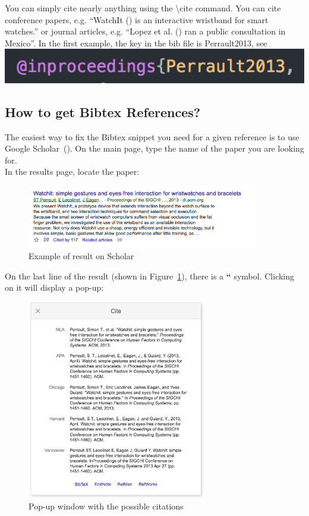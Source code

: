 You can simply cite nearly anything using the \textbackslash{}cite command.
You can cite conference papers, e.g. ``WatchIt (\cite{Perrault2013}) is an interactive wristband for smart watches.'' or journal articles, e.g. ``Lopez et al. (\cite{Lopez2017}) ran a public consultation in Mexico''.
In the first example, the key in the bib file is Perrault2013, see\\
\includegraphics{figures/bibtexkey}

\subsection{How to get Bibtex References?}
The easiest way to fix the Bibtex snippet you need for a given reference is to use Google Scholar~(\cite{Scholar}).
On the main page, type the name of the paper you are looking for.
\\

In the results page, locate the paper:
\begin{figure}[!h]
  \centering
    \includegraphics[width=0.9\textwidth]{figures/scholarrefexample.png}
  \caption{Example of result on Scholar}
  \label{fig:scholarref}
\end{figure}

On the last line of the result (shown in Figure~\ref{fig:scholarref}), there is a \textbf{``} symbol.
Clicking on it will display a pop-up:
\begin{figure}[!h]
  \centering
    \includegraphics[width=0.7\textwidth]{figures/scholarpopup.png}
  \caption{Pop-up window with the possible citations}
  \label{fig:scholarpopup}
\end{figure}
\\

